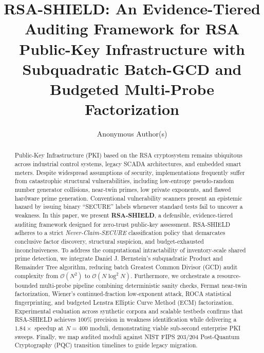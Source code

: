 \documentclass[sigconf,nonacm]{acmart}
\begin{document}
\title{RSA-SHIELD: An Evidence-Tiered Auditing Framework for RSA Public-Key Infrastructure with Subquadratic Batch-GCD and Budgeted Multi-Probe Factorization}

\author{Anonymous Author(s)}







\begin{abstract}
Public-Key Infrastructure (PKI) based on the RSA cryptosystem remains ubiquitous across industrial control systems, legacy SCADA architectures, and embedded smart meters. Despite widespread assumptions of security, implementations frequently suffer from catastrophic structural vulnerabilities, including low-entropy pseudo-random number generator collisions, near-twin primes, low private exponents, and flawed hardware prime generation. Conventional vulnerability scanners present an epistemic hazard by issuing binary ``SECURE'' labels whenever standard tests fail to uncover a weakness. In this paper, we present \textbf{RSA-SHIELD}, a defensible, evidence-tiered auditing framework designed for zero-trust public-key assessment. RSA-SHIELD adheres to a strict \textit{Never-Claim-SECURE} classification policy that demarcates conclusive factor discovery, structural suspicion, and budget-exhausted inconclusiveness. To address the computational intractability of inventory-scale shared prime detection, we integrate Daniel J. Bernstein's subquadratic Product and Remainder Tree algorithm, reducing batch Greatest Common Divisor (GCD) audit complexity from $\mathcal{O}(N^2)$ to $\mathcal{O}(N \log^2 N)$. Furthermore, we orchestrate a resource-bounded multi-probe pipeline combining deterministic sanity checks, Fermat near-twin factorization, Wiener's continued-fraction low-exponent attack, ROCA statistical fingerprinting, and budgeted Lenstra Elliptic Curve Method (ECM) factorization. Experimental evaluation across synthetic corpora and scalable testbeds confirms that RSA-SHIELD achieves 100\% precision in weakness identification while delivering a $1.84\times$ speedup at $N=400$ moduli, demonstrating viable sub-second enterprise PKI sweeps. Finally, we map audited moduli against NIST FIPS 203/204 Post-Quantum Cryptography (PQC) transition timelines to guide legacy migration.
\end{abstract}

\end{document}
